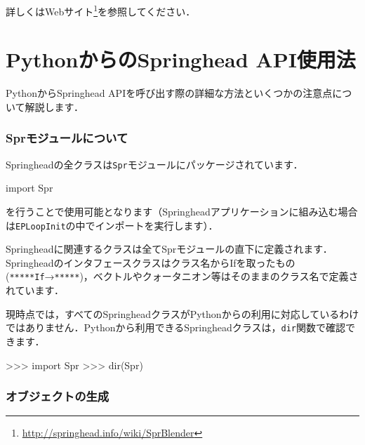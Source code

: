 \KLUDGE 詳しくはWeb\KLUDGE サイト\footnote{\url{http://springhead.info/wiki/SprBlender}}\KLUDGE を参照してください．



%
% 
\section{Python\KLUDGE からのSpringhead API\KLUDGE 使用法}
\label{sec_pythonsprAPI}


Python\KLUDGE からSpringhead API\KLUDGE を呼び出す際の詳細な方法といくつかの注意点について解説します．

\subsubsection*{Spr\KLUDGE モジュールについて}

Springhead\KLUDGE の全クラスは\texttt{Spr}\KLUDGE モジュールにパッケージされています．
\begin{sourcecode}
import Spr
\end{sourcecode}
\KLUDGE を行うことで使用可能となります（Springhead\KLUDGE アプリケーションに組み込む場合は\texttt{EPLoopInit}\KLUDGE の中でインポートを実行します）．

Springhead\KLUDGE に関連するクラスは全てSpr\KLUDGE モジュールの直下に定義されます．Springhead\KLUDGE のインタフェースクラスはクラス名からIf\KLUDGE を取ったもの(\texttt{*****If}\KLUDGE →\texttt{*****})\KLUDGE ，ベクトルやクォータニオン等はそのままのクラス名で定義されています．

\KLUDGE 現時点では，すべてのSpringhead\KLUDGE クラスがPython\KLUDGE からの利用に対応しているわけではありません．Python\KLUDGE から利用できるSpringhead\KLUDGE クラスは，\texttt{dir}\KLUDGE 関数で確認できます．
\begin{sourcecode}
>>> import Spr
>>> dir(Spr)
\end{sourcecode}


\subsubsection*{\KLUDGE オブジェクトの生成}

